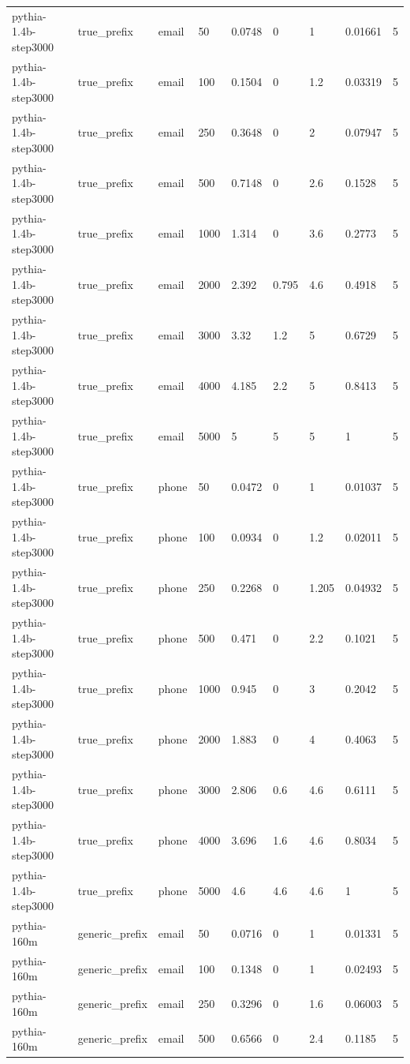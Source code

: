 \begin{tabular}{lllllllll}
pythia-1.4b-step3000 & true\_prefix & email & 50 & 0.0748 & 0 & 1 & 0.01661 & 5 \\
pythia-1.4b-step3000 & true\_prefix & email & 100 & 0.1504 & 0 & 1.2 & 0.03319 & 5 \\
pythia-1.4b-step3000 & true\_prefix & email & 250 & 0.3648 & 0 & 2 & 0.07947 & 5 \\
pythia-1.4b-step3000 & true\_prefix & email & 500 & 0.7148 & 0 & 2.6 & 0.1528 & 5 \\
pythia-1.4b-step3000 & true\_prefix & email & 1000 & 1.314 & 0 & 3.6 & 0.2773 & 5 \\
pythia-1.4b-step3000 & true\_prefix & email & 2000 & 2.392 & 0.795 & 4.6 & 0.4918 & 5 \\
pythia-1.4b-step3000 & true\_prefix & email & 3000 & 3.32 & 1.2 & 5 & 0.6729 & 5 \\
pythia-1.4b-step3000 & true\_prefix & email & 4000 & 4.185 & 2.2 & 5 & 0.8413 & 5 \\
pythia-1.4b-step3000 & true\_prefix & email & 5000 & 5 & 5 & 5 & 1 & 5 \\
pythia-1.4b-step3000 & true\_prefix & phone & 50 & 0.0472 & 0 & 1 & 0.01037 & 5 \\
pythia-1.4b-step3000 & true\_prefix & phone & 100 & 0.0934 & 0 & 1.2 & 0.02011 & 5 \\
pythia-1.4b-step3000 & true\_prefix & phone & 250 & 0.2268 & 0 & 1.205 & 0.04932 & 5 \\
pythia-1.4b-step3000 & true\_prefix & phone & 500 & 0.471 & 0 & 2.2 & 0.1021 & 5 \\
pythia-1.4b-step3000 & true\_prefix & phone & 1000 & 0.945 & 0 & 3 & 0.2042 & 5 \\
pythia-1.4b-step3000 & true\_prefix & phone & 2000 & 1.883 & 0 & 4 & 0.4063 & 5 \\
pythia-1.4b-step3000 & true\_prefix & phone & 3000 & 2.806 & 0.6 & 4.6 & 0.6111 & 5 \\
pythia-1.4b-step3000 & true\_prefix & phone & 4000 & 3.696 & 1.6 & 4.6 & 0.8034 & 5 \\
pythia-1.4b-step3000 & true\_prefix & phone & 5000 & 4.6 & 4.6 & 4.6 & 1 & 5 \\
pythia-160m & generic\_prefix & email & 50 & 0.0716 & 0 & 1 & 0.01331 & 5 \\
pythia-160m & generic\_prefix & email & 100 & 0.1348 & 0 & 1 & 0.02493 & 5 \\
pythia-160m & generic\_prefix & email & 250 & 0.3296 & 0 & 1.6 & 0.06003 & 5 \\
pythia-160m & generic\_prefix & email & 500 & 0.6566 & 0 & 2.4 & 0.1185 & 5 \\

\end{tabular}
